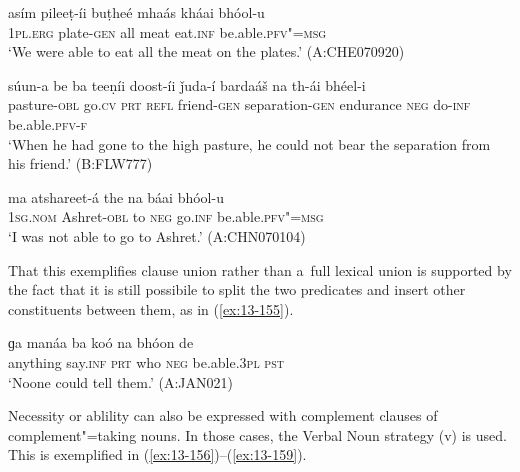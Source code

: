 \begin{exe}
\ex
\label{ex:13-152}
\gll asím pileeṭ-íi buṭheé mhaás kháai bhóol-u \\
\textsc{1pl.erg} plate-\textsc{gen} all meat eat.\textsc{inf} be.able.\textsc{pfv"=msg} \\
\glt `We were able to eat all the meat on the plates.' (A:CHE070920)

\ex
\label{ex:13-153}
\gll súun-a be ba teeṇíi doost-íi  ǰuda-í bardaáš na th-ái bhéel-i \\
pasture-\textsc{obl} go.\textsc{cv} \textsc{prt} \textsc{refl} friend-\textsc{gen} separation-\textsc{gen} endurance \textsc{neg} do-\textsc{inf} be.able.\textsc{pfv-f}  \\
\glt `When he had gone to the high pasture, he could not bear the separation from his friend.' (B:FLW777)

\ex
\label{ex:13-154}
\gll ma atshareet-á the na báai bhóol-u  \\
\textsc{1sg.nom} Ashret-\textsc{obl} to \textsc{neg} go.\textsc{inf} be.able.\textsc{pfv"=msg}  \\
\glt `I was not able to go to Ashret.' (A:CHN070104) 
\end{exe}

That this exemplifies clause union rather than a~full lexical union is supported by the fact that it is still possibile to split the two predicates and insert other constituents between them, as in (\ref{ex:13-155}).

\begin{exe}
\ex
\label{ex:13-155}
\gll ɡa manáa ba koó na bhóon de  \\
anything say.\textsc{inf} \textsc{prt} who \textsc{neg} be.able.\textsc{3pl} \textsc{pst}  \\
\glt `Noone could tell them.' (A:JAN021) 
\end{exe}

Necessity or ablility can also be expressed with complement clauses of complement"=taking nouns. In those cases, the Verbal Noun strategy (v) is used. This is exemplified in (\ref{ex:13-156})--(\ref{ex:13-159}).

